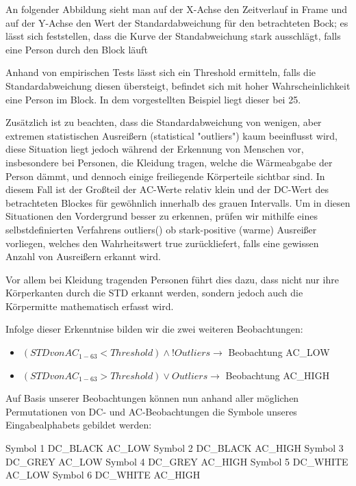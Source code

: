 An folgender Abbildung sieht man auf der X-Achse den Zeitverlauf in Frame und auf der Y-Achse den Wert der Standardabweichung für den betrachteten Bock; es lässt sich feststellen, dass die Kurve der Standabweichung stark ausschlägt, falls eine Person durch den Block läuft

Anhand von empirischen Tests lässt sich ein Threshold ermitteln, falls die Standardabweichung diesen übersteigt, befindet sich mit hoher Wahrscheinlichkeit eine Person im Block.
 In dem vorgestellten Beispiel liegt dieser bei 25.


Zusätzlich ist zu beachten, dass die Standardabweichung von wenigen, aber extremen statistischen Ausreißern (statistical "outliers") kaum beeinflusst wird, diese Situation liegt  jedoch während der Erkennung von Menschen vor, insbesondere bei Personen, die Kleidung tragen, welche die Wärmeabgabe der Person dämmt, und dennoch einige freiliegende Körperteile sichtbar sind.
 In diesem Fall ist der Großteil der AC-Werte relativ klein und der DC-Wert des betrachteten Blockes für gewöhnlich innerhalb des grauen Intervalls.
 Um in diesen Situationen den Vordergrund besser zu erkennen, prüfen wir mithilfe eines selbstdefinierten Verfahrens outliers() ob stark-positive (warme) Ausreißer vorliegen, welches den Wahrheitswert true zurückliefert, falls eine gewissen Anzahl von Ausreißern erkannt wird.


Vor allem bei Kleidung tragenden Personen führt dies dazu, dass nicht nur ihre Körperkanten durch die STD erkannt werden, sondern jedoch auch die Körpermitte mathematisch erfasst wird.



Infolge dieser Erkenntnise bilden wir die zwei weiteren Beobachtungen:

\begin{itemize}
	\item $(STD von AC_{1-63} < Threshold ) \wedge !Outliers \rightarrow$  Beobachtung AC\_LOW
	\item $(STD von AC_{1-63} > Threshold ) \vee Outliers \rightarrow$  Beobachtung AC\_HIGH
\end{itemize}



Auf Basis unserer Beobachtungen können nun anhand aller möglichen Permutationen von DC- und AC-Beobachtungen die Symbole unseres Eingabealphabets gebildet werden:

Symbol 1
DC\_BLACK
AC\_LOW
Symbol 2
DC\_BLACK
AC\_HIGH
Symbol 3
DC\_GREY
AC\_LOW
Symbol 4
DC\_GREY
AC\_HIGH
Symbol 5
DC\_WHITE
AC\_LOW
Symbol 6
DC\_WHITE
AC\_HIGH

